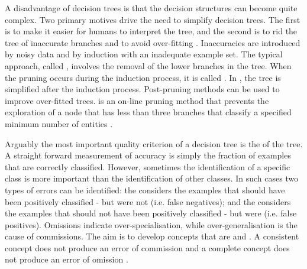 \documentclass[twoside,11pt]{article}
\begin{document}
A disadvantage of decision trees is that the decision structures can become quite complex. Two primary motives drive the need to simplify decision trees.  The first is to make it easier for humans to interpret the tree, and the second is to rid the tree of inaccurate branches and to avoid over-fitting \cite{kubat:review}.  Inaccuracies are introduced by noisy data and by induction with an inadequate example set.  The typical approach, called  , involves the removal of the lower branches in the tree. When the pruning occurs during the induction process, it is called .  In , the tree is simplified after the induction process.  Post-pruning methods can be used to improve over-fitted trees.  is an on-line pruning method that prevents the exploration of a node that has less than three branches that classify a specified minimum number of entities \cite{quinlan:c45}. 

Arguably the most important quality criterion of a decision tree is the  of the tree.  A straight forward measurement of accuracy is simply the fraction of examples that are correctly classified.   However, sometimes the identification of a specific class is more important than the identification of other classes. In such cases two types of errors can be identified: the  considers the examples that should have been positively classified - but were not (i.e. false negatives); and the  considers the examples that should not have been positively classified - but were (i.e. false positives).  Omissions indicate over-specialisation, while over-generalisation is the cause of commissions. The aim is to develop concepts that are   and . A consistent concept does not produce an error of commission and a complete concept does not produce an error of omission \cite{kubat:review}.   
\end{document}
